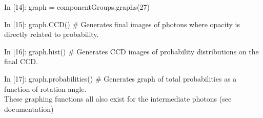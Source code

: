 \documentclass[11pt, oneside]{ltxdoc}   	%
\begin{document}
In [14]: graph = componentGroups.graphs(27)

In [15]: graph.CCD() \# Generates final images of photons where opacity is directly related to probability.

In [16]: graph.hist() \# Generates CCD images of probability distributions on the final CCD.

In [17]: graph.probabilities() \# Generates graph of total probabilities as a function of rotation angle.\\

These graphing functions all also exist for the intermediate photons (see documentation)
\end{document}

